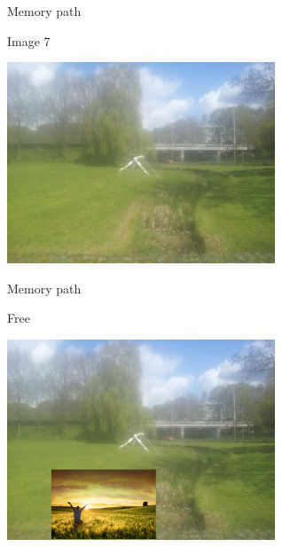 \begin{frame}{Memory path}
  \begin{block}{Image 7}
    \begin{center}
      \includegraphics[height=6cm]{img/loci/07.jpg}
    \end{center}
  \end{block}
\end{frame}
\begin{frame}{Memory path}
  \begin{block}{Free}
    \begin{center}
      \includegraphics[height=6cm]{img/loci/07-free.jpg}
    \end{center}
  \end{block}
\end{frame}

